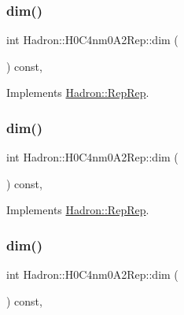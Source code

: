 \subsubsection{\texorpdfstring{dim()}{dim()}\hspace{0.1cm}{\footnotesize\ttfamily [3/5]}}
{\footnotesize\ttfamily int Hadron\+::\+H0\+C4nm0\+A2\+Rep\+::dim (\begin{DoxyParamCaption}{ }\end{DoxyParamCaption}) const\hspace{0.3cm}{\ttfamily [inline]}, {\ttfamily [virtual]}}



Implements \mbox{\hyperlink{structHadron_1_1RepRep_a92c8802e5ed7afd7da43ccfd5b7cd92b}{Hadron\+::\+Rep\+Rep}}.

\mbox{\label{structHadron_1_1H0C4nm0A2Rep_af71f480dfcc57dc4f7f0a03da6dd70d7}} 
\subsubsection{\texorpdfstring{dim()}{dim()}\hspace{0.1cm}{\footnotesize\ttfamily [4/5]}}
{\footnotesize\ttfamily int Hadron\+::\+H0\+C4nm0\+A2\+Rep\+::dim (\begin{DoxyParamCaption}{ }\end{DoxyParamCaption}) const\hspace{0.3cm}{\ttfamily [inline]}, {\ttfamily [virtual]}}



Implements \mbox{\hyperlink{structHadron_1_1RepRep_a92c8802e5ed7afd7da43ccfd5b7cd92b}{Hadron\+::\+Rep\+Rep}}.

\mbox{\label{structHadron_1_1H0C4nm0A2Rep_af71f480dfcc57dc4f7f0a03da6dd70d7}} 
\subsubsection{\texorpdfstring{dim()}{dim()}\hspace{0.1cm}{\footnotesize\ttfamily [5/5]}}
{\footnotesize\ttfamily int Hadron\+::\+H0\+C4nm0\+A2\+Rep\+::dim (\begin{DoxyParamCaption}{ }\end{DoxyParamCaption}) const\hspace{0.3cm}{\ttfamily [inline]}, {\ttfamily [virtual]}}



